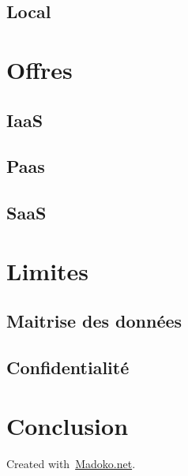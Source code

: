 \documentclass{article}
\begin{document}
\subsection{Local}\label{sec-local}%

\section{Offres}\label{sec-offres}%

\subsection{IaaS}\label{sec-iaas}%

\subsection{Paas}\label{sec-paas}%

\subsection{SaaS}\label{sec-saas}%

\section{Limites}\label{sec-limites}%

\subsection{Maitrise des données}\label{sec-maitrise-des-donnes}%

\subsection{Confidentialité}\label{sec-confidentialit}%

\section{Conclusion}\label{sec-conclusion}%

\begin{mdbmargintb}{4em}{}%
\begin{mdflushright}%
{\tiny{}Created with~\href{https://www.madoko.net}{Madoko.net}.}%
\end{mdflushright}%
\end{mdbmargintb}%
\end{document}
